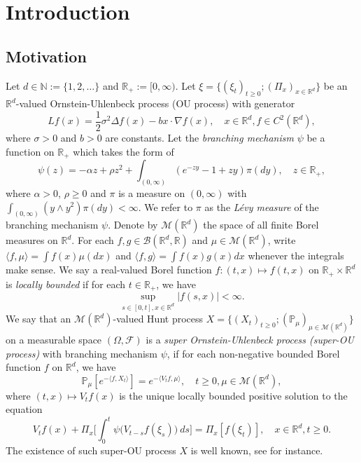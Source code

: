 \documentclass[12pt,a4paper]{amsart}
\theoremstyle{plain}
\theoremstyle{definition}
\numberwithin{equation}{section}
\begin{document}
\section{Introduction}
\subsection{Motivation}
\label{sec: Motivation}
	Let $d \in \mathbb N:= \{1,2,\dots\}$ and $\mathbb R_+:= [0,\infty)$.
    Let $\xi=\{(\xi_t)_{t\geq 0}; (\Pi_x)_{x\in \mathbb R^d}\}$ be an $\mathbb R^d$-valued Ornstein-Uhlenbeck process (OU process) with generator
\begin{equation}
    Lf(x)
    = \frac{1}{2}\sigma^2\Delta f(x)-b x \cdot \nabla f(x),
    \quad  x\in \mathbb R^d, f \in C^2(\mathbb R^d),
\end{equation}
    where $\sigma > 0$ and $b > 0$ are constants.
        Let the \emph{branching mechanism} $\psi$ be a function on $\mathbb R_+$ which takes the form of
\begin{equation} \label{eq: honogeneou branching mechanism}
    \psi(z)=
    - \alpha z + \rho z^2 + \int_{(0,\infty)} (e^{-zy} - 1 + zy) \pi(dy),
    \quad  z \in \mathbb R_+,
\end{equation}
	where $\alpha > 0 $, $\rho \geq0$ and $\pi$ is a measure on $(0,\infty)$ with $\int_{(0,\infty)}(y\wedge y^2) \pi(dy)< \infty$.
	We refer to $\pi$ as the \emph{L\'evy measure} of the branching mechanism $\psi$.
    Denote by $\mathcal M(\mathbb R^d)$ the space of all finite Borel measures on $\mathbb R^d$.
    For each $f,g\in \mathcal B(\mathbb R^d, \mathbb R)$ and $\mu \in \mathcal M(\mathbb R^d)$, write $\langle f,\mu\rangle = \int f(x)\mu(dx)$ and $\langle f, g\rangle = \int f(x)g(x) dx$ whenever the integrals make sense.
    We say a real-valued Borel function $f:(t,x)\mapsto f(t,x)$ on $\mathbb R_+\times \mathbb R^d$ is \emph{locally bounded} if for each $t\in \mathbb R_+$, we have
\[
    \sup_{s\in [0,t],x\in \mathbb R^d} |f(s,x)|<\infty.
\]
       We say that an $\mathcal M(\mathbb R^d)$-valued Hunt process $X = \{(X_t)_{t\geq 0}; (\mathbb{P}_{\mu})_{\mu \in \mathcal M(\mathbb R^d)}\}$
on a measurable space $(\Omega, \mathcal{F})$
       is a \emph{super Ornstein-Uhlenbeck process (super-OU process)} with branching mechanism $\psi$, if for each non-negative bounded Borel function $f$ on $\mathbb R^d$, we have
\begin{equation}
\label{eq: def of V_t}
    \mathbb{P}_{\mu}[e^{-\langle f,X_t \rangle}]
    = e^{-\langle V_tf, \mu \rangle},
    \quad t\geq 0, \mu \in \mathcal M(\mathbb R^d),
\end{equation}
	where $(t,x) \mapsto V_tf(x)$ is the unique locally bounded positive solution to the equation
\begin{equation}
	    V_tf(x) + \Pi_x \Big[ \int_0^t\psi\big(V_{t-s}f(\xi_s)\big)~ds\Big]
	= \Pi_x [f(\xi_t)],
    \quad x\in \mathbb R^d, t\geq 0.
\end{equation}	
    The existence of such super-OU process $X$ is well known, see \cite{Dynkin1993Superprocesses} for instance.
\end{document}
